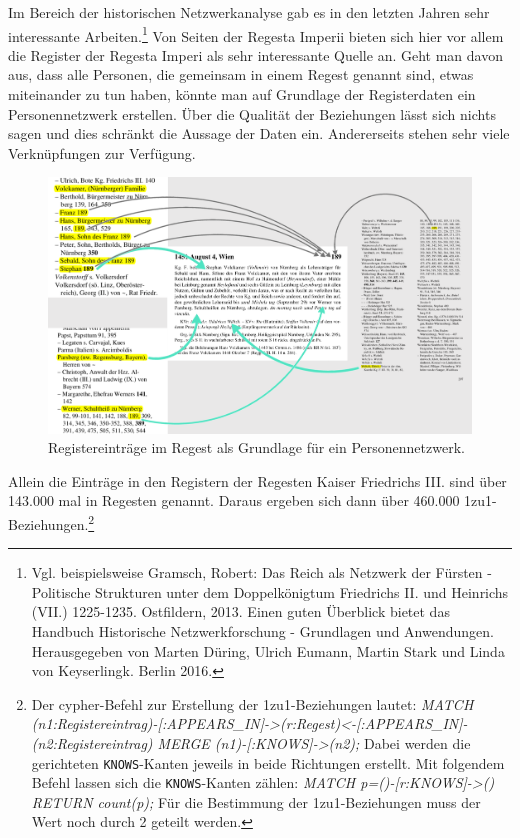 \documentclass[ngerman,]{scrreprt}
\begin{document}
Im Bereich der historischen Netzwerkanalyse gab es in den letzten Jahren sehr interessante Arbeiten.\footnote{Vgl. beispielsweise Gramsch, Robert: Das Reich als Netzwerk der Fürsten - Politische Strukturen unter dem Doppelkönigtum Friedrichs II. und Heinrichs (VII.) 1225-1235. Ostfildern, 2013. Einen guten Überblick bietet das Handbuch Historische Netzwerkforschung - Grundlagen und Anwendungen. Herausgegeben von Marten Düring, Ulrich Eumann, Martin Stark und Linda von Keyserlingk. Berlin 2016.} Von Seiten der Regesta Imperii bieten sich hier vor allem die Register der Regesta Imperi als sehr interessante Quelle an. Geht man davon aus, dass alle Personen, die gemeinsam in einem Regest genannt sind, etwas miteinander zu tun haben, könnte man auf Grundlage der Registerdaten ein Personennetzwerk erstellen. Über die Qualität der Beziehungen lässt sich nichts sagen und dies schränkt die Aussage der Daten ein. Andererseits stehen sehr viele Verknüpfungen zur Verfügung.

\begin{figure}
\centering
\includegraphics{Bilder/Register-und-Regest-19-189.png}
\caption{Registereinträge im Regest als Grundlage für ein Personennetzwerk.}
\end{figure}

Allein die Einträge in den Registern der Regesten Kaiser Friedrichs III. sind über 143.000 mal in Regesten genannt. Daraus ergeben sich dann über 460.000 1zu1-Beziehungen.\footnote{Der cypher-Befehl zur Erstellung der 1zu1-Beziehungen lautet: \emph{MATCH (n1:Registereintrag)-{[}:APPEARS\_IN{]}-\textgreater{}(r:Regest)\textless{}-{[}:APPEARS\_IN{]}-(n2:Registereintrag) MERGE (n1)-{[}:KNOWS{]}-\textgreater{}(n2);} Dabei werden die gerichteten \texttt{KNOWS}-Kanten jeweils in beide Richtungen erstellt. Mit folgendem Befehl lassen sich die \texttt{KNOWS}-Kanten zählen: \emph{MATCH p=()-{[}r:KNOWS{]}-\textgreater{}() RETURN count(p);} Für die Bestimmung der 1zu1-Beziehungen muss der Wert noch durch 2 geteilt werden.}
\end{document}
